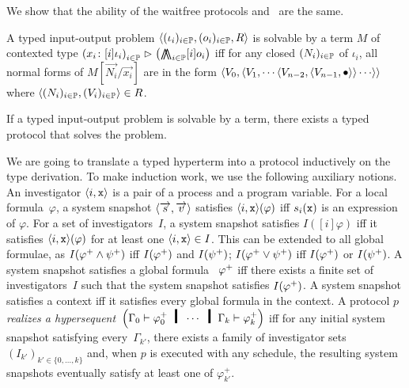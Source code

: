 {We show that the ability of the waitfree protocols and \lgd\, are the same.
\begin{definition}
 A typed input-output problem
 $\langle{(\iota_i)_{i\in \mathbb{P}}, (o_i)_{i\in \mathbb{P}}, R}\rangle$ is
 solvable by a term
 $M$ of contexted type
 $\left({x_i} \colon{[i]\iota_i}\right)_{i\in\mathbb{P}}
 \vartriangleright\left(\operatorname*{\bigwedge\kern -8pt \bigwedge}_{i\in
 \mathbb{P}}[i]o_i\right)$
 iff
 for any closed $(N_i)_{i\in \mathbb{P}}$ of $\iota_i$,
 all normal forms of $M[\vec{N_i}/\vec{x_i}]$
 are in the form
 $\langle{{V_0}, \langle{{V_1},
 \cdots\langle{{V_{n-2}},\langle{{V_{n-1}},\bullet}\rangle}\rangle\cdots}\rangle}\rangle$
 where $\langle{(N_i)_{i\in \mathbb{P}}, (V_i)_{i\in \mathbb{P}}}\rangle\in R$.
\end{definition}

\begin{theorem}[Soundness]
If a typed input-output problem is solvable by a term,
there exists a typed protocol that solves the problem.
\end{theorem}

We are going to translate a typed hyperterm into a protocol inductively
on the type derivation.
To make induction work, we use the following auxiliary notions.
An investigator $\langle{i, \texttt{x}}\rangle$ is a pair of a process and a program
variable.
For a local formula~$\varphi$, a system snapshot $\langle{\overrightarrow s,\overrightarrow v}\rangle$
satisfies
$\langle{i,\texttt{x}}\rangle(\varphi)$ iff
$s_i(\texttt{x})$ is an expression of $\varphi$.
For a set of investigators~$I$,
a system snapshot satisfies
$I([i]\varphi)$ iff it satisfies
$\langle{i, \texttt{x}}\rangle(\varphi)$ for at least one
$\langle{i,\texttt{x}}\rangle\in I$.
This can be extended to all global formulae, as
$I({\varphi}^+\wedge{\psi}^+)$ iff $I({\varphi}^+)$ and $I({\psi}^+)$;
$I({\varphi}^+\vee{\psi}^+)$ iff $I({\varphi}^+)$ or $I({\psi}^+)$.
A system snapshot satisfies a global formula%
~${\varphi}^+$
iff there exists a
finite set of
investigators~$I$ such that the system snapshot satisfies $I({\varphi}^+)$.
A system snapshot satisfies a context%
 iff it
satisfies every global formula in the context.
A protocol $p$ \textit{realizes a hypersequent}~$
\left(\Gamma_0\vdash
\m\varphi_0 \hmid \cdots\hmid\Gamma_{k}\vdash \m\varphi_{k}\right)$
iff
for any initial system snapshot satisfying
every~$\Gamma_{k'}$,
there exists a family of investigator sets
$(I_{k'})_{k'\in\{0,\ldots,k\}}$ and,
when $p$ is executed with any schedule,
the resulting system snapshots eventually satisfy at least one of
$\varphi_{k'}^+$.

}
